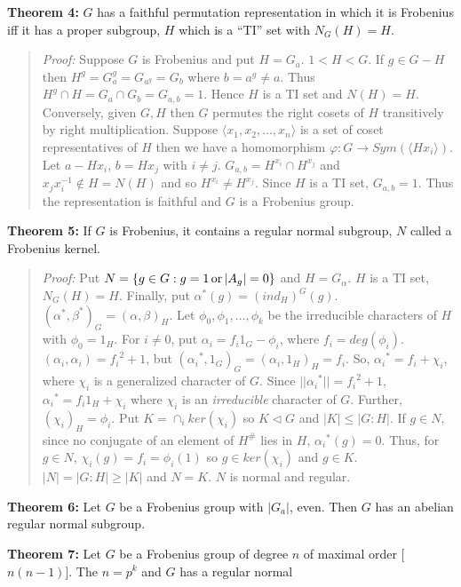 {\bf Theorem 4:} $G$ has a faithful permutation representation in which it is Frobenius iff it has a proper
subgroup, $H$ which is a ``TI'' set with $N_G(H)=H$.
\begin{quote}
\emph{Proof:}
Suppose $G$ is Frobenius and put $H=G_a$. $1 < H < G$.   If $g \in G-H$ then
$H^g= G_a^g= G_{a^g}= G_b$ where $b= a^g \ne a$.   Thus $H^g \cap H = G_a \cap G_b= G_{a,b}=1$.
Hence $H$ is a TI set and $N(H)=H$.  Conversely,
given $G, H$ then $G$ permutes the right cosets of $H$ transitively by right multiplication.
Suppose $\langle x_1, x_2, \ldots , x_n \rangle$ is a set of coset representatives of $H$ then
we have a homomorphism $\varphi: G \rightarrow Sym(\langle Hx_i \rangle)$.  Let
$a- H x_i$, $b= Hx_j$ with $i \ne j$.  $G_{a,b}= H^{x_i} \cap H^{x_j}$ and
$x_j x_i^{-1} \notin H=N(H)$ and so $H^{x_i} \ne H^{x_j}$.   Since $H$ is a TI set,
$G_{a,b} = 1$.  Thus the representation is faithful and $G$ is a Frobenius group.
\end{quote}
{\bf Theorem 5:} If $G$ is Frobenius, it contains a regular normal subgroup, $N$ called a Frobenius kernel.
\begin{quote}
\emph{Proof:}
Put $N = \{ g \in G: g= 1 {\thinspace {\textnormal {or}} \thinspace} |A_g|=0 \}$ and $H=G_{\alpha}$. $H$ is a TI set, $N_G(H)=H$.
Finally, put $\alpha^*(g) = (ind_H)^G(g)$.  $(\alpha^*, \beta^*)_G = (\alpha, \beta)_H$.  Let $\phi_0, \phi_1, \ldots, \phi_k$ be
the irreducible characters of $H$ with $\phi_0 = 1_H$.  For $i \ne 0$, put $\alpha_i = f_i 1_G - \phi_i$, where $f_i = deg(\phi_i)$.
$(\alpha_i, \alpha_i) = {f_i}^2 + 1$, but $({\alpha_i}^*, 1_G)_G = (\alpha_i, 1_H)_H = f_i$.  So, ${\alpha_i}^* = f_i + \chi_i$, where
$\chi_i$ is a generalized character of $G$.  Since $||{\alpha_i}^*|| = {f_i}^2 +1$, ${\alpha_i}^* = f_i 1_H + \chi_i$ where $\chi_i$
is an \emph{irreducible} character of $G$.  Further, $(\chi_i)_H = \phi_i$.  Put $K= \cap_i ker(\chi_i)$ so $K \lhd G$ and $|K| \leq |G:H|$.
If $g \in N$, since no conjugate of an element of $H^{\#}$ lies in $H$, ${\alpha_i}^*(g) = 0$.  Thus, for $g \in N$,
 $\chi_i(g) = f_i = \phi_i(1)$ so $g  \in ker(\chi_i)$ and $g \in K$. $|N|=|G:H| \geq |K|$ and $N=K$.  $N$ is normal and regular.
\end{quote}
{\bf Theorem 6:} 
Let $G$ be a Frobenius group with $|G_a|$, even.  Then $G$ has an abelian regular normal subgroup.
\begin{quote}
\end{quote}
{\bf Theorem 7:} 
Let $G$ be a Frobenius group of degree $n$ of maximal order [$n(n-1)$].  The $n = p^k$ and $G$ has a regular normal
